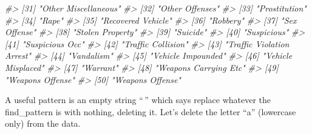 \documentclass[
]{krantz}
\makeatletter
\newenvironment{Shaded}{\begin{snugshade}}{\end{snugshade}}
\newcommand{\CommentTok}[1]{\textcolor[rgb]{0.37,0.37,0.37}{\textit{#1}}}
\newenvironment{kframe}{%
\medskip{}
\setlength{\fboxsep}{.8em}
 \def\at@end@of@kframe{}%
 \ifinner\ifhmode%
  \def\at@end@of@kframe{\end{minipage}}%
  \begin{minipage}{\columnwidth}%
 \fi\fi%
 \def\FrameCommand##1{\hskip\@totalleftmargin \hskip-\fboxsep
 \colorbox{shadecolor}{##1}\hskip-\fboxsep
     \hskip-\linewidth \hskip-\@totalleftmargin \hskip\columnwidth}%
 \MakeFramed {\advance\hsize-\width
   \@totalleftmargin\z@ \linewidth\hsize
   \@setminipage}}%
 {\par\unskip\endMakeFramed%
 \at@end@of@kframe}
\renewenvironment{Shaded}{\begin{kframe}}{\end{kframe}}
\makeatother
\begin{document}
\begin{Shaded}
\begin{Highlighting}[]
\CommentTok{\#\textgreater{} [31] "Other Miscellaneous"                       }
\CommentTok{\#\textgreater{} [32] "Other Offenses"                            }
\CommentTok{\#\textgreater{} [33] "Prostitution"                              }
\CommentTok{\#\textgreater{} [34] "Rape"                                      }
\CommentTok{\#\textgreater{} [35] "Recovered Vehicle"                         }
\CommentTok{\#\textgreater{} [36] "Robbery"                                   }
\CommentTok{\#\textgreater{} [37] "Sex Offense"                               }
\CommentTok{\#\textgreater{} [38] "Stolen Property"                           }
\CommentTok{\#\textgreater{} [39] "Suicide"                                   }
\CommentTok{\#\textgreater{} [40] "Suspicious"                                }
\CommentTok{\#\textgreater{} [41] "Suspicious Occ"                            }
\CommentTok{\#\textgreater{} [42] "Traffic Collision"                         }
\CommentTok{\#\textgreater{} [43] "Traffic Violation Arrest"                  }
\CommentTok{\#\textgreater{} [44] "Vandalism"                                 }
\CommentTok{\#\textgreater{} [45] "Vehicle Impounded"                         }
\CommentTok{\#\textgreater{} [46] "Vehicle Misplaced"                         }
\CommentTok{\#\textgreater{} [47] "Warrant"                                   }
\CommentTok{\#\textgreater{} [48] "Weapons Carrying Etc"                      }
\CommentTok{\#\textgreater{} [49] "Weapons Offense"                           }
\CommentTok{\#\textgreater{} [50] "Weapons Offense"}
\end{Highlighting}
\end{Shaded}

A useful pattern is an empty string ``\,'' which says
replace whatever the find\_pattern is with nothing, deleting
it. Let's delete the letter ``a'' (lowercase only) from the
data.
\end{document}
